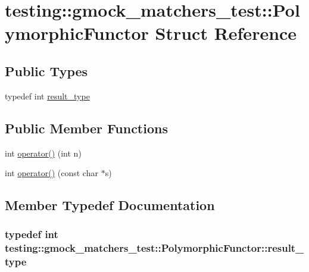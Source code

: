 \hypertarget{structtesting_1_1gmock__matchers__test_1_1PolymorphicFunctor}{}\section{testing\+:\+:gmock\+\_\+matchers\+\_\+test\+:\+:Polymorphic\+Functor Struct Reference}
\label{structtesting_1_1gmock__matchers__test_1_1PolymorphicFunctor}
\subsection*{Public Types}
\begin{DoxyCompactItemize}
\item 
typedef int \hyperlink{structtesting_1_1gmock__matchers__test_1_1PolymorphicFunctor_ae2b921ecae158b5eaa11a29ac6fe0cf3}{result\+\_\+type}
\end{DoxyCompactItemize}
\subsection*{Public Member Functions}
\begin{DoxyCompactItemize}
\item 
int \hyperlink{structtesting_1_1gmock__matchers__test_1_1PolymorphicFunctor_a2fb8b012acd2ccd52788231036877c98}{operator()} (int n)
\item 
int \hyperlink{structtesting_1_1gmock__matchers__test_1_1PolymorphicFunctor_aee4d200c7f85ce4d8048d1798a511002}{operator()} (const char $\ast$s)
\end{DoxyCompactItemize}


\subsection{Member Typedef Documentation}
\subsubsection[{\texorpdfstring{result\+\_\+type}{result_type}}]{\setlength{\rightskip}{0pt plus 5cm}typedef int {\bf testing\+::gmock\+\_\+matchers\+\_\+test\+::\+Polymorphic\+Functor\+::result\+\_\+type}}\hypertarget{structtesting_1_1gmock__matchers__test_1_1PolymorphicFunctor_ae2b921ecae158b5eaa11a29ac6fe0cf3}{}\label{structtesting_1_1gmock__matchers__test_1_1PolymorphicFunctor_ae2b921ecae158b5eaa11a29ac6fe0cf3}


